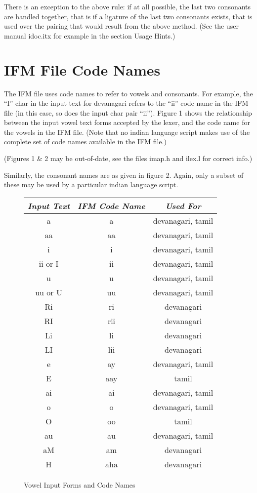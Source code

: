 \documentclass[11pt]{article}
\begin{document}
There is an exception to the above rule: if at all possible, the last two
consonants are handled together, that is if a ligature of the last two
consonants
exists, that is used over the pairing that would result from the above method.
(See the user manual idoc.itx for example in the section Usage Hints.)

\section{IFM File Code Names}

The IFM file uses code names to refer to vowels and consonants.
For example, the ``I'' char in the input text for devanagari refers
to the ``ii'' code name in the IFM file (in this case, so does the input
char pair ``ii'').
Figure 1 shows the relationship between  the input vowel text forms
accepted by the
lexer, and the code name for the vowels in the IFM file.
(Note that no indian language script makes use of the complete set
of code names available in the IFM file.)

(Figures 1 \& 2 may be out-of-date, see the files imap.h and ilex.l
for correct info.)

Similarly, the consonant names are as given in figure 2.
Again, only a subset of these may be used by a particular indian
language script.

\bigskip
\begin{figure}
\begin{center}
\begin{tabular}{|c|c|c|}
\hline
{\em Input Text}	& {\em IFM Code Name}  & {\em Used For} \\
\hline\hline
a	& a	& devanagari, tamil \\ \hline
aa	& aa	& devanagari, tamil \\ \hline
i	& i	& devanagari, tamil \\ \hline
ii or I	& ii	& devanagari, tamil \\ \hline
u	& u	& devanagari, tamil \\ \hline
uu or U	& uu	& devanagari, tamil \\ \hline
Ri	& ri	& devanagari \\ \hline
RI	& rii	& devanagari \\ \hline
Li	& li	& devanagari \\ \hline
LI	& lii	& devanagari \\ \hline
e	& ay	& devanagari, tamil \\ \hline
E	& aay	& tamil \\ \hline
ai	& ai	& devanagari, tamil \\ \hline
o	& o	& devanagari, tamil \\ \hline
O	& oo	& tamil \\ \hline
au	& au	& devanagari, tamil \\ \hline
aM	& am	& devanagari\\ \hline
H	& aha	& devanagari\\ \hline
\end{tabular}
\end{center}
\caption {Vowel Input Forms and Code Names}
\end{figure}
\end{document}
